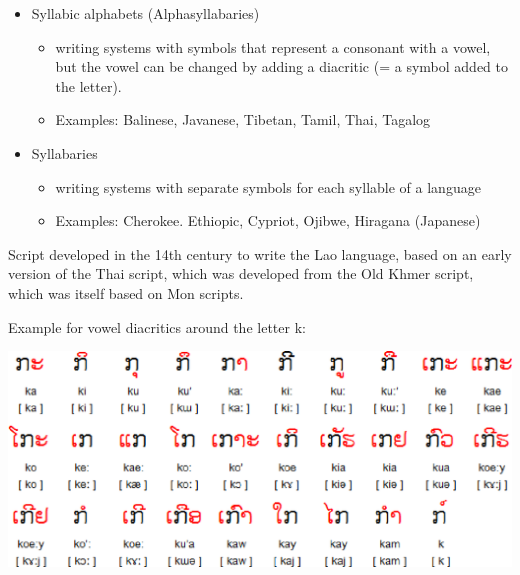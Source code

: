 \documentclass[a4paper,landscape,headrule,footrule,xetex]{foils}
\begin{document}
\MyLogo{}
\begin{itemize}
\item Syllabic alphabets (Alphasyllabaries)
\begin{itemize}
\item writing systems with symbols that represent a consonant with a
  vowel, but the vowel can be changed by adding a diacritic (= a
  symbol added to the letter).
\item Examples: Balinese, Javanese, Tibetan, Tamil, Thai, Tagalog
\end{itemize}
\item Syllabaries
\begin{itemize}
\item writing systems with separate symbols for each syllable of a language
\item Examples: Cherokee. Ethiopic, Cypriot, Ojibwe, Hiragana (Japanese)
\end{itemize}
\end{itemize}








 Script developed in the 14th
century to write the Lao language, based on an early version of the
Thai script, which was developed from the Old Khmer script, which was
itself based on Mon scripts.

Example for vowel diacritics around the letter k:

\includegraphics{../pics/lao_vwl.eps}

\end{document}
